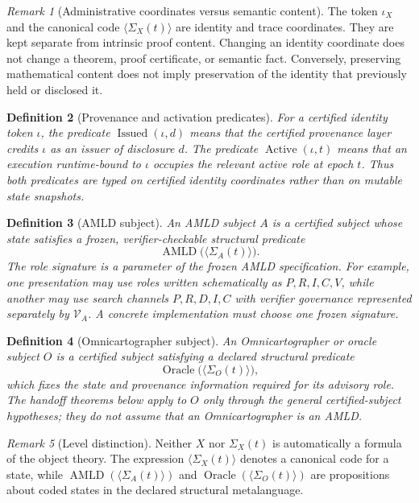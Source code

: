 \documentclass[11pt]{article}
\newtheorem{definition}{Definition}[section]
\theoremstyle{remark}
\newtheorem{remark}[definition]{Remark}
\newcommand{\Issued}{\operatorname{Issued}}
\newcommand{\Active}{\operatorname{Active}}
\newcommand{\AMLD}{\operatorname{AMLD}}
\newcommand{\Oracle}{\operatorname{Oracle}}
\begin{document}
\begin{remark}[Administrative coordinates versus semantic content]
The token $\iota_X$ and the canonical code $\langle\Sigma_X(t)\rangle$ are identity and trace coordinates. They are kept separate from intrinsic proof content. Changing an identity coordinate does not change a theorem, proof certificate, or semantic fact. Conversely, preserving mathematical content does not imply preservation of the identity that previously held or disclosed it.
\end{remark}

\begin{definition}[Provenance and activation predicates]
For a certified identity token $\iota$, the predicate $\Issued(\iota,d)$ means that the certified provenance layer credits $\iota$ as an issuer of disclosure $d$. The predicate $\Active(\iota,t)$ means that an execution runtime-bound to $\iota$ occupies the relevant active role at epoch $t$. Thus both predicates are typed on certified identity coordinates rather than on mutable state snapshots.
\end{definition}

\begin{definition}[AMLD subject]
An AMLD subject $A$ is a certified subject whose state satisfies a frozen, verifier-checkable structural predicate
\[
\AMLD\bigl(\langle\Sigma_A(t)\rangle\bigr).
\]
The role signature is a parameter of the frozen AMLD specification. For example, one presentation may use roles written schematically as $P,R,I,C,V$, while another may use search channels $P,R,D,I,C$ with verifier governance represented separately by $\mathcal V_A$. A concrete implementation must choose one frozen signature.
\end{definition}

\begin{definition}[Omnicartographer subject]
An Omnicartographer or oracle subject $O$ is a certified subject satisfying a declared structural predicate
\[
\Oracle\bigl(\langle\Sigma_O(t)\rangle\bigr),
\]
which fixes the state and provenance information required for its advisory role. The handoff theorems below apply to $O$ only through the general certified-subject hypotheses; they do not assume that an Omnicartographer is an AMLD.
\end{definition}

\begin{remark}[Level distinction]
Neither $X$ nor $\Sigma_X(t)$ is automatically a formula of the object theory. The expression $\langle\Sigma_X(t)\rangle$ denotes a canonical code for a state, while $\AMLD(\langle\Sigma_A(t)\rangle)$ and $\Oracle(\langle\Sigma_O(t)\rangle)$ are propositions about coded states in the declared structural metalanguage.
\end{remark}
\end{document}
